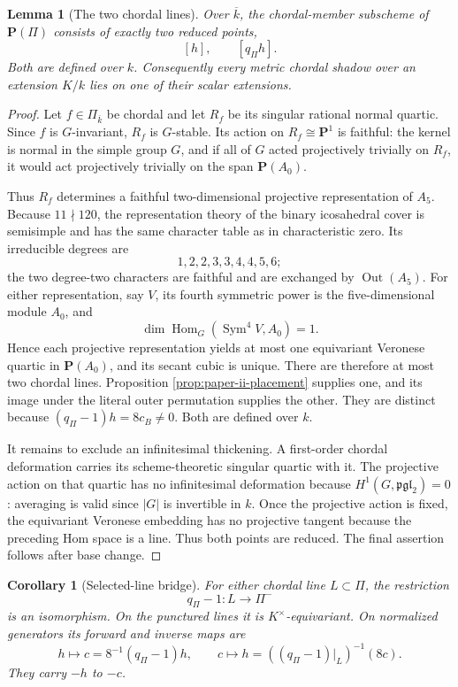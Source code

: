 \documentclass[11pt]{article}
\newtheorem{lemma}[theorem]{Lemma}
\newtheorem{corollary}[theorem]{Corollary}
\theoremstyle{definition}
\theoremstyle{remark}
\newcommand{\PP}{\mathbf P}
\newcommand{\Sym}{\operatorname{Sym}}
\newcommand{\Hom}{\operatorname{Hom}}
\begin{document}
\begin{lemma}[The two chordal lines]
\label{lem:two-chordal-lines}
Over \(\overline{k}\), the chordal-member subscheme of \(\PP(\Pi)\) consists
of exactly two reduced points,
\[
                         [h],\qquad[q_\Pi h].
\]
Both are defined over \(k\).  Consequently every metric chordal shadow over
an extension \(K/k\) lies on one of their scalar extensions.
\end{lemma}

\begin{proof}
Let \(f\in\Pi_{\overline{k}}\) be chordal and let \(R_f\) be its singular
rational normal quartic.  Since \(f\) is \(G\)-invariant, \(R_f\) is
\(G\)-stable.  Its action on \(R_f\cong\PP^1\) is faithful: the kernel is
normal in the simple group \(G\), and if all of \(G\) acted projectively
trivially on \(R_f\), it would act projectively trivially on the span
\(\PP(A_0)\).

Thus \(R_f\) determines a faithful two-dimensional projective representation
of \(A_5\).  Because \(11\nmid120\), the representation theory of the binary
icosahedral cover is semisimple and has the same character table as in
characteristic zero.  Its irreducible degrees are
\[
                       1,2,2,3,3,4,4,5,6;
\]
the two degree-two characters are faithful and are exchanged by
\(\operatorname{Out}(A_5)\).  For either representation,
say \(V\), its fourth symmetric power is the five-dimensional module
\(A_0\), and
\[
             \dim\Hom_G(\Sym^4V,A_0)=1.
\]
Hence each projective representation yields at most one equivariant
Veronese quartic in \(\PP(A_0)\), and its secant cubic is unique.  There are
therefore at most two chordal lines.  Proposition
\ref{prop:paper-ii-placement} supplies one, and its image under the literal
outer permutation supplies the other.  They are distinct because
\((q_\Pi-1)h=8c_B\ne0\).  Both are defined over \(k\).

It remains to exclude an infinitesimal thickening.  A first-order chordal
deformation carries its scheme-theoretic singular quartic with it.  The
projective action on that quartic has no infinitesimal deformation because
\(H^1(G,\mathfrak{pgl}_2)=0\): averaging is valid since \(|G|\) is invertible
in \(k\).  Once the projective action is fixed, the equivariant Veronese
embedding has no projective tangent because the preceding Hom space is a
line.  Thus both points are reduced.  The final assertion follows after
base change.
\end{proof}

\begin{corollary}[Selected-line bridge]
\label{cor:selected-line-bridge}
For either chordal line \(L\subset\Pi\), the restriction
\[
 q_\Pi-1:L\longrightarrow\Pi^-
\]
is an isomorphism.  On the punctured lines it is \(K^\times\)-equivariant.
On normalized generators its forward and inverse maps are
\[
 h\longmapsto c=8^{-1}(q_\Pi-1)h,\qquad
 c\longmapsto h=((q_\Pi-1)|_L)^{-1}(8c).
\]
They carry \(-h\) to \(-c\).
\end{corollary}
\end{document}
